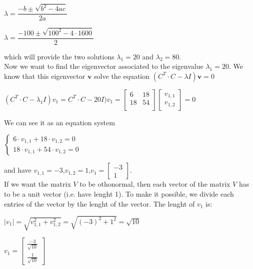 \begin{center}
		$\lambda=\dfrac{-b\pm\sqrt{b^2-4ac}}{2a}$

\end{center}
\begin{center}
	$\lambda=\dfrac{-100\pm\sqrt{100^2-4\cdot1600}}{2}$
	
\end{center}
which will provide the two solutions $ \lambda_1=20 $ and $\lambda_2=80$.\\
Now we want to find the eigenvector associated to the eigenvalue $ \lambda_1=20 $. We know that this eigenvector $ \textbf{v} $ solve the equation $ (C^T \cdot C-\lambda I)\textbf{v}=0 $ \\
\begin{center}
	$  (C^T \cdot C-\lambda_1 I)v_1= C^T \cdot C-20 I) v_1= \begin{bmatrix}
	6 &   18 \\
	18  &  54\\
	\end{bmatrix}\begin{bmatrix}v_{1,1}\\v_{1,2}\end{bmatrix}=0 $
\end{center}
We can see it as an equation system
\begin{center}
	
$ \begin{cases} 6\cdot v_{1,1}+18 \cdot v_{1,2}=0 \\
   18\cdot v_{1,1}+54 \cdot v_{1,2}=0 \end{cases} $
\end{center}
and have $ v_{1,1}=-3 $,\quad $ v_{1,2}=1 $,\quad $v_1=\begin{bmatrix}
-3\\
1
\end{bmatrix}$.\\
If we want the matrix $ V $ to be othonormal, then each vector of the matrix $ V $ has to be a unit vector (i.e. have lenght 1). To make it possible, we divide each entries of the vector by the lenght of the vector.
The lenght of $v_1$ is:
\begin{center}
	$ |v_1| = \sqrt{v_{1,1}^2+v_{1,2}^2}=\sqrt{(-3)^2+1^2}=\sqrt{10}$
\end{center}
\begin{center}
	$ v_1=\begin{bmatrix}
	\frac{-3}{\sqrt{10}}\\
	\frac{1}{\sqrt{10}}
	\end{bmatrix} $
\end{center}

